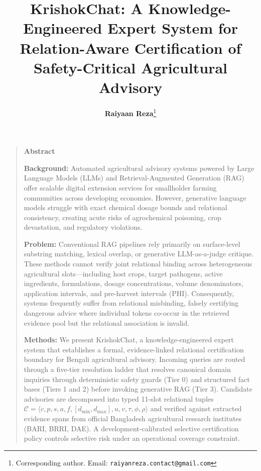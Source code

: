\documentclass[11pt,a4paper]{article}
\title{\vspace{-1.5em}\LARGE\bfseries\color{agriDark} KrishokChat: A Knowledge-Engineered Expert System for Relation-Aware Certification of Safety-Critical Agricultural Advisory\vspace{0.3em}}
\author{\textbf{Raiyaan Reza}\thanks{Corresponding author. Email: \texttt{raiyanreza.contact@gmail.com}}}
\affil{\small Independent Agricultural AI Researcher \& Systems Engineer, Dhaka, Bangladesh}
\date{}
\begin{document}
\maketitle
\thispagestyle{plain}

\vspace{-1.0em}
\begin{quote}
\small
\noindent\textbf{\color{agriDark}\large Abstract}\vspace{0.4em}

\noindent
\textbf{Background:} Automated agricultural advisory systems powered by Large Language Models (LLMs) and Retrieval-Augmented Generation (RAG) offer scalable digital extension services for smallholder farming communities across developing economies. However, generative language models struggle with exact chemical dosage bounds and relational consistency, creating acute risks of agrochemical poisoning, crop devastation, and regulatory violations.

\vspace{0.3em}
\noindent
\textbf{Problem:} Conventional RAG pipelines rely primarily on surface-level substring matching, lexical overlap, or generative LLM-as-a-judge critique. These methods cannot verify joint relational binding across heterogeneous agricultural slots—including host crops, target pathogens, active ingredients, formulations, dosage concentrations, volume denominators, application intervals, and pre-harvest intervals (PHI). Consequently, systems frequently suffer from relational misbinding, falsely certifying dangerous advice where individual tokens co-occur in the retrieved evidence pool but the relational association is invalid.

\vspace{0.3em}
\noindent
\textbf{Methods:} We present KrishokChat, a knowledge-engineered expert system that establishes a formal, evidence-linked relational certification boundary for Bengali agricultural advisory. Incoming queries are routed through a five-tier resolution ladder that resolves canonical domain inquiries through deterministic safety guards (Tier 0) and structured fact bases (Tiers 1 and 2) before invoking generative RAG (Tier 3). Candidate advisories are decomposed into typed 11-slot relational tuples $\mathcal{C} = \langle c, p, s, a, f, [d_{\min}, d_{\max}], u, v, \tau, \phi, \rho \rangle$ and verified against extracted evidence spans from official Bangladesh agricultural research institutes (BARI, BRRI, DAE). A development-calibrated selective certification policy controls selective risk under an operational coverage constraint.


\end{quote}
\end{document}
